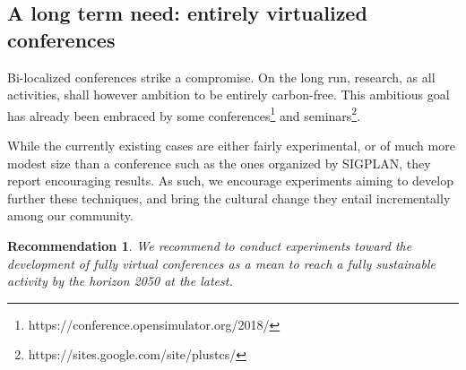 \documentclass[manuscript, review, screen]{acmart}
\newcommand{\yz}[1]{\textcolor{blue}{{[YZ:~#1]}}}
\newcommand{\yz}[1]{}
\newtheorem{recommend}{Recommendation}
\begin{document}
\subsection{A long term need: entirely virtualized conferences}

Bi-localized conferences strike a compromise. On the long run, research, as all
activities, shall however ambition to be entirely carbon-free. This ambitious
goal has already been embraced by some conferences\footnote{https://conference.opensimulator.org/2018/}
and seminars\footnote{https://sites.google.com/site/plustcs/}.

While the currently existing cases are either fairly experimental, or of much more
modest size than a conference such as the ones organized by SIGPLAN, they report
encouraging results. As such, we encourage experiments aiming to develop further
these techniques, and bring the cultural change they entail incrementally among
our community.

\begin{recommend}
  We recommend to conduct experiments toward the development of fully virtual
  conferences as a mean to reach a fully sustainable activity by the horizon 2050
  at the latest.
\end{recommend}





\end{document}
